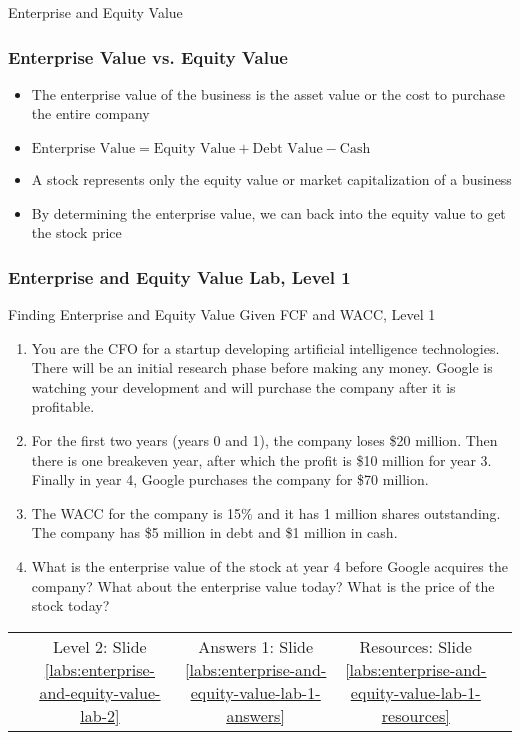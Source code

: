 \documentclass[handout, 11pt]{beamer}
\begin{document}
\begin{section}[EV]{Enterprise and Equity Value}
\begin{frame}
\frametitle{Enterprise Value vs. Equity Value}
\begin{itemize}
\item The enterprise value of the business is the asset value or the cost to purchase the entire company
\vfill
\item $\text{Enterprise Value} = \text{Equity Value} + \text{Debt Value} - \text{Cash}$
\vfill
\item A stock represents only the equity value or market capitalization of a business
\vfill
\item By determining the enterprise value, we can back into the equity value to get the stock price
\end{itemize}
\end{frame}
\small
\begin{frame}
\frametitle{Enterprise and Equity Value Lab, Level 1}
{
\begin{block}{Finding Enterprise and Equity Value Given FCF and WACC, Level 1}
\begin{enumerate}
\item You are the CFO for a startup developing artificial intelligence technologies. There will be an initial research phase before making any money. Google is watching your development and will purchase the company after it is profitable.
\item For the first two years (years 0 and 1), the company loses \$20 million. Then there is one breakeven year, after which the profit is \$10 million for year 3. Finally in year 4, Google purchases the company for \$70 million.
\item The WACC for the company is 15\% and it has 1 million shares outstanding. The company has \$5 million in debt and \$1 million in cash.
\item What is the enterprise value of the stock at year 4 before Google acquires the company? What about the enterprise value today? What is the price of the stock today?
\end{enumerate}
\vfill
\begin{tabular*}{\textwidth}{@{\extracolsep{\fill}}ccccc}
\toprule
\hfill & Level 2: Slide \textcolor{blue}{\underline{\ref{labs:enterprise-and-equity-value-lab-2}}} & Answers 1: Slide \textcolor{blue}{\underline{\ref{labs:enterprise-and-equity-value-lab-1-answers}}} & Resources: Slide \textcolor{blue}{\underline{\ref{labs:enterprise-and-equity-value-lab-1-resources}}} & \hfill\\

\end{tabular*}
\end{block}
}
\label{labs:enterprise-and-equity-value-lab-1}
\end{frame}
\normalsize
\end{section}
\end{document}
